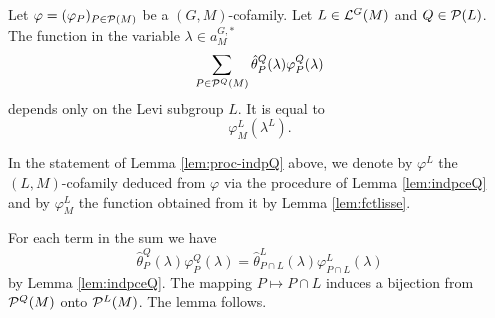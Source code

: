 \begin{lemme}\label{lem:proc-indpQ}
    Let $\varphi=(\varphi_P)_{P\in \mathcal{P}(M)}$ be a $(G,M)$-cofamily. Let $L\in \mathcal{L}^G(M)$ and $Q\in \mathcal{P}(L)$. The function in the variable $\lambda\in a_M^{G,*}$
$$\sum_{P\in \mathcal{P}^Q(M)} \hat{\theta}_P^Q(\lambda) \varphi_P^Q(\lambda)$$
depends only on the Levi subgroup $L$. It is equal to 
$$\varphi_{M}^{L}(\lambda^{L}).$$
\end{lemme}

\begin{remarque}
In the statement of Lemma \ref{lem:proc-indpQ} above, we denote by $\varphi^{L}$ the $(L,M)$-cofamily deduced from $\varphi$ via the procedure of Lemma \ref{lem:indpceQ} and by $\varphi^{L}_M$ the function obtained from it by Lemma \ref{lem:fctlisse}.
\end{remarque}
  
\begin{preuve}
For each term in the sum we have 
$$ \hat{\theta}_P^Q(\lambda) \varphi_P^Q(\lambda)=\hat{\theta}_{P\cap L}^L(\lambda) \varphi_{P\cap L}^L(\lambda)$$
by Lemma \ref{lem:indpceQ}. The mapping $P\mapsto P\cap L$ induces a bijection from $\mathcal{P}^Q(M)$ onto $\mathcal{P}^L(M)$. The lemma follows.
\end{preuve}

